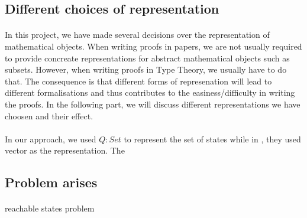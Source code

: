 \subsection{Different choices of representation}
\paragraph{} In this project, we have made several decisions over the
representation of mathematical objects. When writing proofs in papers,
we are not usually required to provide
concreate representations for abstract mathematical objects such as
subsets. However, when writing proofs in Type Theory, we usually have
to do that. The consequence is that different forms of represenation
will lead to different formalisations and thus contributes to the
easiness/difficulty in writing the proofs. In the following part, we
will discuss different representations we have choosen and their
effect. 

\paragraph{} In our approach,
we used \(Q : Set\) to represent the set of states while in
\cite{firsov2013}, they used vector as the representation. The 


\subsection{Problem arises}
\paragraph{} reachable states problem 
